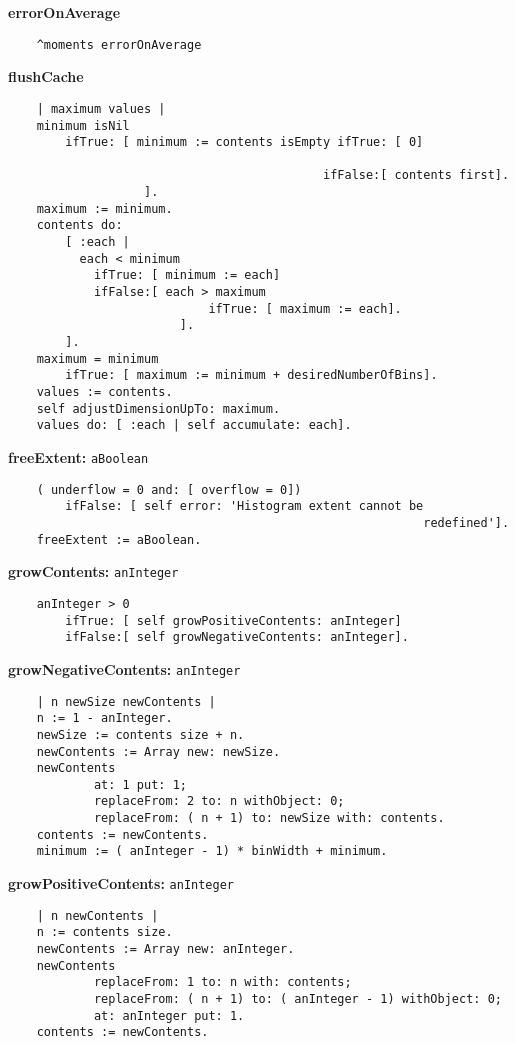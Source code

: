 {\bf errorOnAverage}
\begin{verbatim}
    ^moments errorOnAverage

\end{verbatim}
{\bf flushCache}
\begin{verbatim}
    | maximum values |
    minimum isNil
        ifTrue: [ minimum := contents isEmpty ifTrue: [ 0]
                                                                      
                                            ifFalse:[ contents first].
                   ].
    maximum := minimum.
    contents do:
        [ :each |
          each < minimum
            ifTrue: [ minimum := each]
            ifFalse:[ each > maximum
                            ifTrue: [ maximum := each].
                        ].
        ].
    maximum = minimum
        ifTrue: [ maximum := minimum + desiredNumberOfBins].
    values := contents.
    self adjustDimensionUpTo: maximum.
    values do: [ :each | self accumulate: each].

\end{verbatim}
{\bf freeExtent:} {\tt aBoolean}
\begin{verbatim}
    ( underflow = 0 and: [ overflow = 0])
        ifFalse: [ self error: 'Histogram extent cannot be 
                                                          redefined'].
    freeExtent := aBoolean.

\end{verbatim}
{\bf growContents:} {\tt anInteger}
\begin{verbatim}
    anInteger > 0
        ifTrue: [ self growPositiveContents: anInteger]
        ifFalse:[ self growNegativeContents: anInteger].

\end{verbatim}
{\bf growNegativeContents:} {\tt anInteger}
\begin{verbatim}
    | n newSize newContents |
    n := 1 - anInteger.
    newSize := contents size + n.
    newContents := Array new: newSize.
    newContents
            at: 1 put: 1;
            replaceFrom: 2 to: n withObject: 0;
            replaceFrom: ( n + 1) to: newSize with: contents.
    contents := newContents.
    minimum := ( anInteger - 1) * binWidth + minimum.

\end{verbatim}
{\bf growPositiveContents:} {\tt anInteger}
\begin{verbatim}
    | n newContents |
    n := contents size.
    newContents := Array new: anInteger.
    newContents
            replaceFrom: 1 to: n with: contents;
            replaceFrom: ( n + 1) to: ( anInteger - 1) withObject: 0;
            at: anInteger put: 1.
    contents := newContents.

\end{verbatim}
